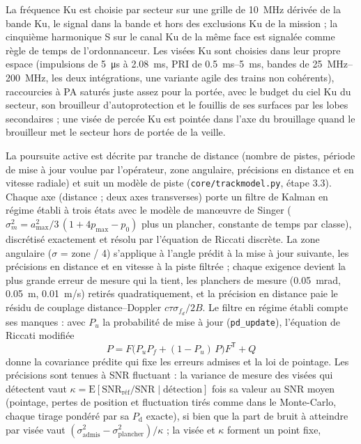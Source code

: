 \documentclass[11pt,a4paper]{article}
\newcommand{\code}[1]{\texttt{\small #1}}
\newcommand{\Pd}{P_{\mathrm d}}
\begin{document}
La fréquence Ku est choisie par secteur sur une grille de \SI{10}{MHz} dérivée de la bande Ku, le signal dans la bande
et hors des exclusions Ku de la mission ; la cinquième harmonique S sur le canal Ku de la même face est signalée comme
règle de temps de l'ordonnanceur. Les visées Ku sont choisies dans leur propre espace (impulsions de
\SI{5}{\micro s} à \SI{2.08}{ms}, PRI de \SIrange{0.5}{5}{ms}, bandes de \SIrange{25}{200}{MHz}, les deux intégrations,
une variante agile des trains non cohérents), raccourcies à PA saturés juste assez pour la portée, avec le budget du
ciel Ku du secteur, son brouilleur d'autoprotection et le fouillis de ses surfaces par les lobes secondaires ; une visée
de percée Ku est pointée dans l'axe du brouillage quand le brouilleur met le secteur hors de portée de la veille.

La poursuite active est décrite par tranche de distance (nombre de pistes, période de mise à jour voulue par
l'opérateur, zone angulaire, précisions en distance et en vitesse radiale) et suit un modèle de piste
(\code{core/trackmodel.py}, étape 3.3). Chaque axe (distance ; deux axes transverses) porte un filtre de Kalman en
régime établi à trois états avec le modèle de man\oe{}uvre de Singer
($\sigma_m^2 = a_{\max}^2/3\,(1 + 4p_{\max} - p_0)$ plus un plancher, constante de temps par classe), discrétisé
exactement et résolu par l'équation de Riccati discrète. La zone angulaire ($\sigma$ = zone / 4) s'applique à l'angle
prédit à la mise à jour suivante, les précisions en distance et en vitesse à la piste filtrée ; chaque exigence devient
la plus grande erreur de mesure qui la tient, les planchers de mesure (\SI{0.05}{mrad}, \SI{0.05}{m}, \SI{0.01}{m/s})
retirés quadratiquement, et la précision en distance paie le résidu de couplage distance--Doppler
$c\tau\sigma_{f_d}/2B$. Le filtre en régime établi compte ses manques : avec $P_u$ la probabilité de mise à jour
(\code{pd\_update}), l'équation de Riccati modifiée
\[
  P = F\bigl(P_u P_f + (1-P_u)\,P\bigr)F^{\mathsf T} + Q
\]
donne la covariance prédite qui fixe les erreurs admises et la loi de pointage. Les précisions sont tenues à SNR
fluctuant : la variance de mesure des visées qui détectent vaut $\kappa = \mathrm{E}[\mathrm{SNR}_{\text{réf}}/
\mathrm{SNR} \mid \text{détection}]$ fois sa valeur au SNR moyen (pointage, pertes de position et fluctuation tirés comme
dans le Monte-Carlo, chaque tirage pondéré par sa $\Pd$ exacte), si bien que la part de bruit à atteindre par visée vaut
$(\sigma_{\mathrm{admis}}^2 - \sigma_{\mathrm{plancher}}^2)/\kappa$ ; la visée et $\kappa$ forment un point fixe,
\end{document}
